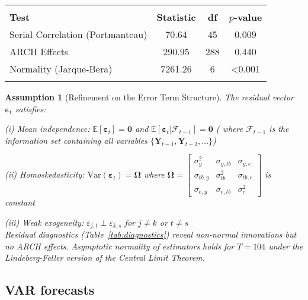 \documentclass[
]{article}
\let\oldtable\table
\let\endoldtable\endtable
\renewenvironment{table}[1][H]{\oldtable[H]}{\endoldtable}
\newtheorem{assumption}{Assumption} %
\begin{document}
	\begin{table}[!htbp]
		\centering
		\caption{\textsc{Residual Diagnostic Tests}}
		\label{tab:diagnostics}
		\small
		\begin{tabular}{@{}lSSS@{}}
			\\  \hline \hline \\
			\textbf{Test} & \textbf{Statistic} & \textbf{df} & \textbf{$p$-value} \\ 
			\midrule
			Serial Correlation (Portmanteau) & 70.64 & 45 & 0.009 \\
			ARCH Effects & 290.95 & 288 & 0.440 \\
			Normality (Jarque-Bera) & 7261.26 & 6 & <0.001 \\
			\hline \hline  \\
		\end{tabular}
	\end{table}
	
	\begin{assumption}[Refinement on the Error Term Structure]\label{assump:errors}
		The residual vector $\bm{\varepsilon}_t$ satisfies: 
		
		(i) Mean independence: $\mathbb{E}[\bm{\varepsilon}_t] = 
		\bm{0}$ and $\mathbb{E}[\bm{\varepsilon}_t|\mathcal{F}_{t-1}] = \bm{0}$ ( where 
		$\mathcal{F}_{t-1}$ is the information set containing all variables $\{\bm{Y}_{t-1}, \bm{Y}_{t-2}, \dots\}$)
		
		(ii) Homoskedasticity: $\text{Var}(\bm{\varepsilon}_t) = \bm{\Omega}$ where 
		$\bm{\Omega} = \begin{bmatrix}
			\sigma^2_y & \sigma_{y,tb} & \sigma_{y,e} \\
			\sigma_{tb,y} & \sigma^2_{tb} & \sigma_{tb,e} \\
			\sigma_{e,y} & \sigma_{e,tb} & \sigma^2_e
		\end{bmatrix}$ is constant 
		
		(iii) Weak exogeneity: $\varepsilon_{j,t} \perp \varepsilon_{k,s}$ for $j \neq k$ or $t \neq s$ \\
		Residual diagnostics (Table~\ref{tab:diagnostics}) reveal non-normal innovations but no ARCH effects.
		Asymptotic normality of estimators holds for $T=104$ under the Lindeberg-Feller version of the Central Limit Theorem.
	\end{assumption}
	
	
	\subsection{VAR forecasts}
	
\end{document}
